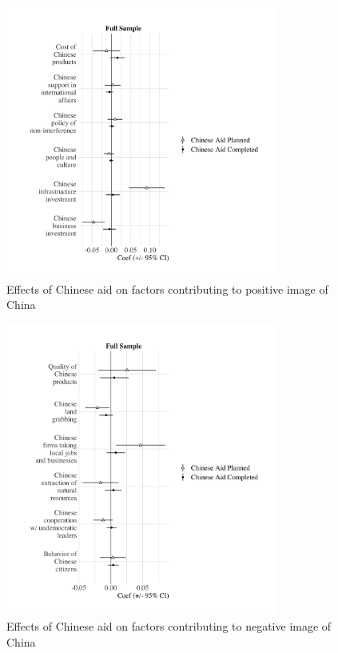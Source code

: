 \documentclass[9pt]{article}
\begin{document}
\begin{figure}[H]
\centering
\includegraphics[width=0.8\textwidth]{figures/figure_04.png}
\caption{Effects of Chinese aid on factors contributing to positive image of China}
\end{figure}

\begin{figure}[H]
\centering
\includegraphics[width=0.8\textwidth]{figures/figure_05.png}
\caption{Effects of Chinese aid on factors contributing to negative image of China}
\end{figure}
\end{document}
